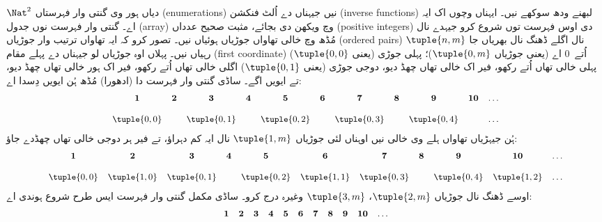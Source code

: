 \documentclass[../../../include/open-logic-section]{subfiles}
\begin{document}


\begin{explain}
$\Nat^2$ دیاں ہور وی گنتی وار فہرستاں (enumerations) نیں جیہناں دے
اُلٹ فنکشن (inverse functions) لبھنے ودھ سوکھے نیں۔ ایہناں وچوں اک
ایہ اے۔ گنتی وار فہرست نوں جدول (array) وچ ویکھن دی بجائے، مثبت صحیح
عدداں (positive integers) دی اوس فہرست توں شروع کرو جیہدے نال مُڈھ وچ
خالی تھاواں جوڑیاں ہوئیاں نیں۔ تصور کرو کہ ایہ تھاواں ترتیب وار
جوڑیاں (ordered pairs) $\tuple{n,m}$ نال اگلے ڈھنگ نال بھریاں جا رہیاں نیں۔
پہلاں اوہ جوڑیاں لو جیہناں دے پہلے مقام (first coordinate) اُتے~$0$ اے (یعنی جوڑیاں
$\tuple{0,m}$)؛ پہلی جوڑی (یعنی $\tuple{0,0}$) پہلی خالی تھاں اُتے
رکھو، فیر اک خالی تھاں چھڈ دیو، دوجی جوڑی (یعنی $\tuple{0,1}$) اگلی
خالی تھاں اُتے رکھو، فیر اک ہور خالی تھاں چھڈ دیو، تے ایویں اگے۔
ساڈی گنتی وار فہرست دا (ادھورا) مُڈھ ہُن ایویں دِسدا اے:
\[\small
\begin{array}{@{}c c c c c c c c c c c@{}}
\mathbf 1 & \mathbf 2 & \mathbf 3 & \mathbf 4 & \mathbf 5 & \mathbf 6 & \mathbf 7 & \mathbf 8 & \mathbf 9 & \mathbf{10} & \dots \\ \\
\tuple{0,0} &  & \tuple{0,1} &  & \tuple{0,2} &  & \tuple{0,3} & & \tuple{0,4} &  & \dots \\
\end{array}
\]
ہُن جیہڑیاں تھاواں ہلے وی خالی نیں اوہناں لئی جوڑیاں $\tuple{1,m}$
نال ایہ کم دہراؤ، تے فیر ہر دوجی خالی تھاں چھڈدے جاؤ:
\[\small
\begin{array}{@{}c c c c c c c c c c c@{}}
\mathbf 1 & \mathbf 2 & \mathbf 3 & \mathbf 4 & \mathbf 5 & \mathbf 6 & \mathbf 7 & \mathbf 8 & \mathbf 9 & \mathbf{10} & \dots \\ \\
\tuple{0,0} & \tuple{1,0} & \tuple{0,1} &  & \tuple{0,2} & \tuple{1,1} &
\tuple{0,3} & & \tuple{0,4} &  \tuple{1,2} & \dots \\
\end{array}
\]
اوسے ڈھنگ نال جوڑیاں $\tuple{2,m}$، $\tuple{3,m}$ وغیرہ درج کرو۔
ساڈی مکمل گنتی وار فہرست ایس طرح شروع ہوندی اے:
\[\small
\begin{array}{@{}cc c c c c c c c c c@{}}
\mathbf 1 & \mathbf 2 & \mathbf 3 & \mathbf 4 & \mathbf 5 & \mathbf 6 & \mathbf 7 & \mathbf 8 & \mathbf 9 & \mathbf{10} & \dots \\ \\

\end{array}\]
\end{explain}
\end{document}
